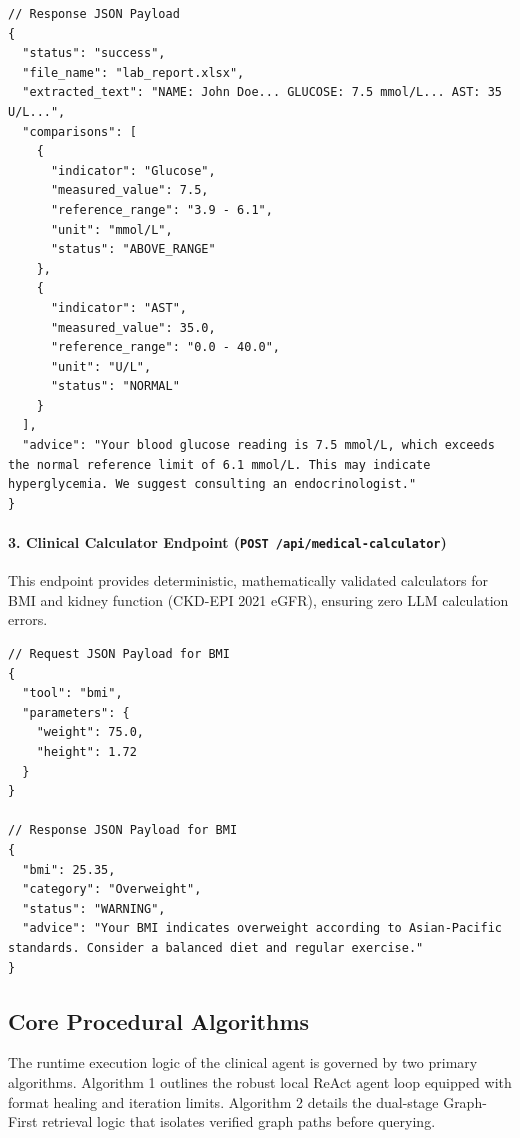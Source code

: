 \documentclass[../main.tex]{subfiles}
\begin{document}
\begin{lstlisting}[basicstyle=\footnotesize\ttfamily,breaklines=true,columns=fullflexible]
// Response JSON Payload
{
  "status": "success",
  "file_name": "lab_report.xlsx",
  "extracted_text": "NAME: John Doe... GLUCOSE: 7.5 mmol/L... AST: 35 U/L...",
  "comparisons": [
    {
      "indicator": "Glucose",
      "measured_value": 7.5,
      "reference_range": "3.9 - 6.1",
      "unit": "mmol/L",
      "status": "ABOVE_RANGE"
    },
    {
      "indicator": "AST",
      "measured_value": 35.0,
      "reference_range": "0.0 - 40.0",
      "unit": "U/L",
      "status": "NORMAL"
    }
  ],
  "advice": "Your blood glucose reading is 7.5 mmol/L, which exceeds the normal reference limit of 6.1 mmol/L. This may indicate hyperglycemia. We suggest consulting an endocrinologist."
}
\end{lstlisting}

\paragraph{3. Clinical Calculator Endpoint (\texttt{POST /api/medical-calculator})}
This endpoint provides deterministic, mathematically validated calculators for BMI and kidney function (CKD-EPI 2021 eGFR), ensuring zero LLM calculation errors.

\begin{lstlisting}[basicstyle=\footnotesize\ttfamily,breaklines=true,columns=fullflexible]
// Request JSON Payload for BMI
{
  "tool": "bmi",
  "parameters": {
    "weight": 75.0,
    "height": 1.72
  }
}

// Response JSON Payload for BMI
{
  "bmi": 25.35,
  "category": "Overweight",
  "status": "WARNING",
  "advice": "Your BMI indicates overweight according to Asian-Pacific standards. Consider a balanced diet and regular exercise."
}
\end{lstlisting}

\subsection{Core Procedural Algorithms}
\label{subsection:4.2.5}

The runtime execution logic of the clinical agent is governed by two primary algorithms. Algorithm 1 outlines the robust local ReAct agent loop equipped with format healing and iteration limits. Algorithm 2 details the dual-stage Graph-First retrieval logic that isolates verified graph paths before querying.
\end{document}
